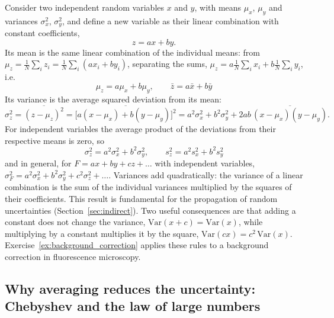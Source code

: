 \documentclass[letterpaper,11pt,leqno]{book}
\begin{document}
Consider two independent random variables $x$ and $y$, with means $\mu_x$, $\mu_y$ and variances $\sigma_x^2$, $\sigma_y^2$, and define a new variable as their linear combination with constant coefficients,
\begin{equation}
z = ax + by.
\end{equation}
Its mean is the same linear combination of the individual means: from $\mu_z = \frac{1}{N}\sum_i z_i = \frac{1}{N}\sum_i(ax_i + by_i)$, separating the sums, $\mu_z = a\frac{1}{N}\sum_i x_i + b\frac{1}{N}\sum_i y_i$, i.e.
\begin{equation}
\boxed{\mu_z = a\mu_x + b\mu_y, \qquad \bar{z} = a\bar{x} + b\bar{y}}
\label{eq:mean_linear_combination}
\end{equation}
Its variance is the average squared deviation from its mean:
\begin{equation}
\sigma_z^2 = \overline{(z - \mu_z)^2} = \overline{\big[a(x - \mu_x) + b(y - \mu_y)\big]^2} = a^2\sigma_x^2 + b^2\sigma_y^2 + 2ab\,\overline{(x - \mu_x)(y - \mu_y)}.
\end{equation}
For independent variables the average product of the deviations from their respective means is zero, so
\begin{equation}
\boxed{\sigma_z^2 = a^2\sigma_x^2 + b^2\sigma_y^2, \qquad s_z^2 = a^2s_x^2 + b^2s_y^2}
\label{eq:variance_linear_combination}
\end{equation}
and in general, for $F = ax + by + cz + \dots$ with independent variables, $\sigma_F^2 = a^2\sigma_x^2 + b^2\sigma_y^2 + c^2\sigma_z^2 + \dots$. Variances add quadratically: the variance of a linear combination is the sum of the individual variances multiplied by the squares of their coefficients. This result is fundamental for the propagation of random uncertainties (Section~\ref{sec:indirect}). Two useful consequences are that adding a constant does not change the variance, $\text{Var}(x + c) = \text{Var}(x)$, while multiplying by a constant multiplies it by the square, $\text{Var}(cx) = c^2\,\text{Var}(x)$. Exercise~\ref{ex:background_correction} applies these rules to a background correction in fluorescence microscopy.

\subsection{Why averaging reduces the uncertainty: Chebyshev and the law of large numbers}
\end{document}

